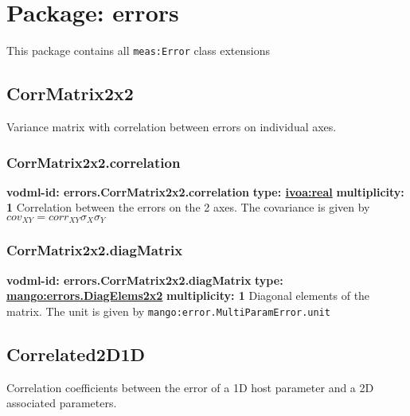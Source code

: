 \pagebreak
\section{Package: errors }


  This package contains all \texttt{meas:Error} class extensions

  \subsection{CorrMatrix2x2}
  \label{sect:errors.CorrMatrix2x2}
    Variance matrix with correlation between errors on individual axes.

    \subsubsection{CorrMatrix2x2.correlation}
      \textbf{vodml-id: errors.CorrMatrix2x2.correlation} \newline
      \textbf{type: \hyperref[sect:ivoa]{ivoa:real}} \newline
      \textbf{multiplicity: 1} \newline 
      Correlation between the errors on the 2 axes. The covariance is given by $cov_{XY}=corr_{XY}\sigma_{X}\sigma_{Y}$

    \subsubsection{CorrMatrix2x2.diagMatrix}
      \textbf{vodml-id: errors.CorrMatrix2x2.diagMatrix} \newline
      \textbf{type: \hyperref[sect:errors.DiagElems2x2]{mango:errors.DiagElems2x2}} \newline
      \textbf{multiplicity: 1} \newline 
      Diagonal elements of the matrix. The unit is given by \texttt{mango:error.MultiParamError.unit}

  \subsection{Correlated2D1D}
  \label{sect:errors.Correlated2D1D}
    Correlation coefficients between the error of a 1D host parameter and a 2D associated parameters.

